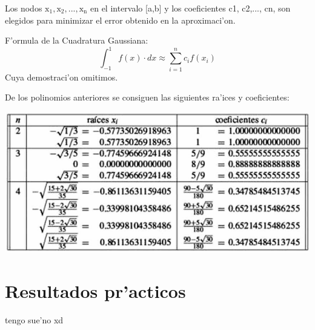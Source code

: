 \documentclass{article}
\begin{document}
				Los nodos $\mathrm{x_{1}, x_{2},..., x_{n}}$ en el intervalo [a,b] y los coeficientes c1, c2,..., cn, son elegidos para minimizar el error obtenido en la aproximaci'on.
				
				F'ormula de la Cuadratura Gaussiana: 
				\begin{equation}\label{eq:cuadGauss}
					\int_{-1}^{1} f(x) \cdot dx \approx \sum_{i=1}^{n} c_{i} f(x_{i})
				\end{equation}
				Cuya demostraci'on omitimos.

				
				
				De los polinomios anteriores se consiguen las siguientes ra'ices y coeficientes:\\
				
				\begin{center}
					\includegraphics[width=15cm]{roots}
					\par
					\vspace{0.2cm}
				\end{center}
				
	
		
		\section*{Resultados pr'acticos}
		
		\begin{thebibliography}{00}
			 tengo sue'no xd
		\end{thebibliography}
	
\end{document}
